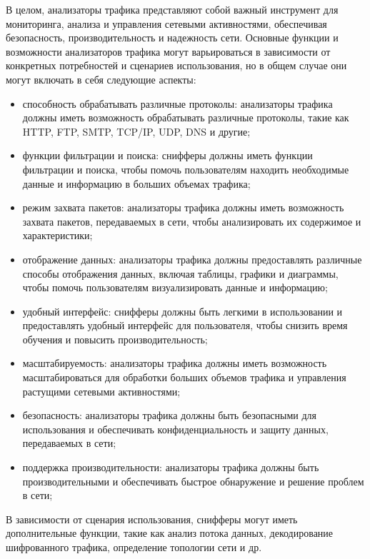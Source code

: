 В целом, анализаторы трафика представляют собой важный инструмент
для мониторинга, анализа и управления сетевыми активностями, обеспечивая
безопасность, производительность и надежность сети. Основные функции и
возможности анализаторов трафика могут варьироваться в зависимости от
конкретных потребностей и сценариев использования, но в общем случае они
могут включать в себя следующие аспекты:
\begin{itemize}
    \item способность обрабатывать различные протоколы: анализаторы трафика
    должны иметь возможность обрабатывать различные протоколы, такие как
    HTTP, FTP, SMTP, TCP/IP, UDP, DNS и другие;
    \item функции фильтрации и поиска: снифферы должны иметь функции
    фильтрации и поиска, чтобы помочь пользователям находить необходимые
    данные и информацию в больших объемах трафика;
    \item режим захвата пакетов: анализаторы трафика должны иметь возможность
    захвата пакетов, передаваемых в сети, чтобы анализировать их содержимое и
    характеристики;
    \item отображение данных: анализаторы трафика должны предоставлять
    различные способы отображения данных, включая таблицы, графики и
    диаграммы, чтобы помочь пользователям визуализировать данные и
    информацию;
    \item удобный интерфейс: снифферы должны быть легкими в использовании и
    предоставлять удобный интерфейс для пользователя, чтобы снизить время
    обучения и повысить производительность;
    \item масштабируемость: анализаторы трафика должны иметь возможность
    масштабироваться для обработки больших объемов трафика и управления
    растущими сетевыми активностями;
    \item безопасность: анализаторы трафика должны быть безопасными для
    использования и обеспечивать конфиденциальность и защиту данных,
    передаваемых в сети;
    \item поддержка производительности: анализаторы трафика должны быть
    производительными и обеспечивать быстрое обнаружение и решение проблем в
    сети;
\end{itemize}


В зависимости от сценария использования, снифферы могут иметь
дополнительные функции, такие как анализ потока данных, декодирование
шифрованного трафика, определение топологии сети и др.



